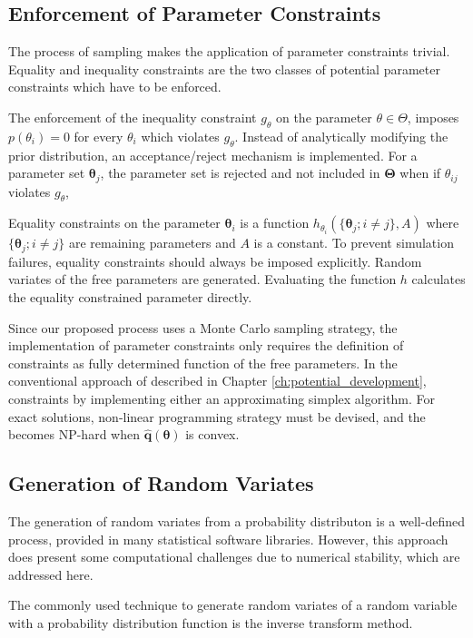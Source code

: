 \subsection{Enforcement of Parameter Constraints}

The process of sampling makes the application of parameter constraints trivial.  Equality and inequality constraints are the two classes of potential parameter constraints which have to be enforced.

The enforcement of the inequality constraint $g_{\theta}$ on the parameter $\theta \in \Theta$, imposes $p(\theta_i)=0$ for every $\theta_i$ which violates $g_{\theta}$.  Instead of analytically modifying the prior distribution, an acceptance/reject mechanism is implemented.  For a parameter set $\bm{\theta}_j$, the parameter set is rejected and not included in $\bm{\Theta}$ when if $\theta_{ij}$ violates $g_{\theta}$,

Equality constraints on the parameter $\bm{\theta}_i$ is a function $h_{\theta_i} (\{\bm{\theta}_j; i \neq j\},A)$ where $\{\bm{\theta}_j; i \neq j\}$ are remaining parameters and $A$ is a constant.  To prevent simulation failures, equality constraints should always be imposed explicitly.  Random variates of the free parameters are generated.  Evaluating the function $h$ calculates the equality constrained parameter directly.

Since our proposed process uses a Monte Carlo sampling strategy, the implementation of parameter constraints only requires the definition of constraints as fully determined function of the free parameters.  In the conventional approach of described in Chapter \ref{ch:potential_development}, constraints by implementing either an approximating simplex algorithm.  For exact solutions, non-linear programming strategy must be devised, and the becomes NP-hard when $\hat{\bm{q}}(\bm{\theta})$ is convex\cite{bertsekas1995_nlp}.

\subsection{Generation of Random Variates}
\label{sec:generating_random_variates}

The generation of random variates from a probability distributon is a well-defined process, provided in many statistical software libraries.  However, this approach does present some computational challenges due to numerical stability, which are addressed here.

The commonly used technique to generate random variates of a random variable with a probability distribution function is the inverse transform method.

